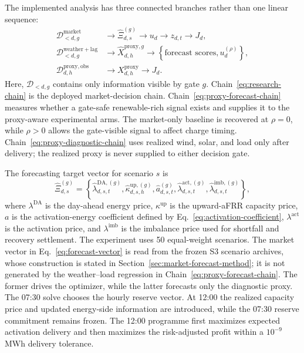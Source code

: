 \documentclass[11pt,a4paper]{article}
\begin{document}
The implemented analysis has three connected branches rather than one linear
sequence:
\begin{align}
  \mathcal{D}^{\mathrm{market}}_{<d,g}
  &\longrightarrow \widehat{\Xi}^{(g)}_{d,s}
  \longrightarrow u_d
  \longrightarrow z_{d,t}
  \longrightarrow J_d,
  \label{eq:research-chain}\tag{C1}\\
  \mathcal{D}^{\mathrm{weather+lag}}_{<d,g}
  &\longrightarrow \widehat X^{\mathrm{proxy},g}_{d,h}
  \longrightarrow \left\{\text{forecast scores},u_d^{(\rho)}\right\},
  \label{eq:proxy-forecast-chain}\tag{C2}\\
  \mathcal{D}^{\mathrm{proxy,obs}}_{d,h}
  &\longrightarrow X^{\mathrm{proxy}}_{d,h}
  \longrightarrow J_d.
  \label{eq:proxy-diagnostic-chain}\tag{C3}
\end{align}
Here, $\mathcal{D}_{<d,g}$ contains only information visible by gate $g$.
Chain~\eqref{eq:research-chain} is the deployed market-decision chain.
Chain~\eqref{eq:proxy-forecast-chain} measures whether a gate-safe
renewable-rich signal exists and supplies it to the proxy-aware experimental
arms.  The market-only baseline is recovered at $\rho=0$, while $\rho>0$
allows the gate-visible signal to affect charge timing.  Chain~\eqref{eq:proxy-diagnostic-chain}
uses realized wind, solar, and load only after delivery; the realized proxy is
never supplied to either decision gate.

The forecasting target vector for scenario $s$ is
\begin{equation}
  \widehat{\Xi}^{(g)}_{d,s}
  =\left\{
  \widehat{\lambda}^{\mathrm{DA},(g)}_{d,s,t},
  \widehat{\kappa}^{\mathrm{up},(g)}_{d,s,h},
  \widehat{a}^{(g)}_{d,s,t},
  \widehat{\lambda}^{\mathrm{act},(g)}_{d,s,t},
  \widehat{\lambda}^{\mathrm{imb},(g)}_{d,s,t}
  \right\},
  \label{eq:forecast-vector}
\end{equation}
where $\lambda^{\mathrm{DA}}$ is the day-ahead energy price,
$\kappa^{\mathrm{up}}$ is the upward-aFRR capacity price, $a$ is the
activation-energy coefficient defined by Eq.~\eqref{eq:activation-coefficient},
$\lambda^{\mathrm{act}}$ is the activation
price, and $\lambda^{\mathrm{imb}}$ is the imbalance price used for shortfall
and recovery settlement.  The experiment uses 50 equal-weight scenarios.  The
market vector in Eq.~\eqref{eq:forecast-vector} is read from the frozen S3
scenario archives, whose construction is stated in
Section~\ref{sec:market-forecast-method}; it is not generated by the
weather--load regression in
Chain~\eqref{eq:proxy-forecast-chain}.  The former drives the optimizer, while
the latter forecasts only the diagnostic proxy.
The
07:30 solve chooses the hourly reserve vector.  At 12:00 the realized capacity
price and updated energy-side information are introduced, while the 07:30
reserve commitment remains frozen.  The 12:00 programme first maximizes
expected activation delivery and then maximizes the risk-adjusted profit within
a $10^{-9}$ MWh delivery tolerance.
\end{document}
